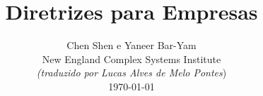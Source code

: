 \documentclass[onecolumn,journal]{IEEEtran}
\begin{document}
\title{\color{Brown}  Diretrizes para Empresas
\vspace{-0.35ex}}
\author{Chen Shen e Yaneer Bar-Yam \\ New England Complex Systems Institute \\
\vspace{+0.35ex}
\small{\textit{(traduzido por Lucas Alves de Melo Pontes})}\\
 \today
  \vspace{-8ex} \\
\textbf{}
 }

\maketitle




\thispagestyle{empty} %





\end{document}
